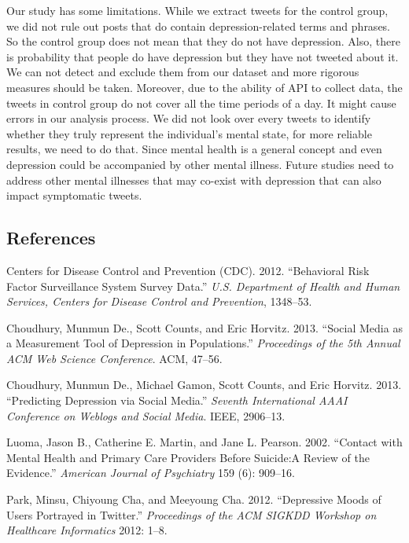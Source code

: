 \documentclass[]{article}
\begin{document}
Our study has some limitations. While we extract tweets for the control
group, we did not rule out posts that do contain depression-related
terms and phrases. So the control group does not mean that they do not
have depression. Also, there is probability that people do have
depression but they have not tweeted about it. We can not detect and
exclude them from our dataset and more rigorous measures should be
taken. Moreover, due to the ability of API to collect data, the tweets
in control group do not cover all the time periods of a day. It might
cause errors in our analysis process. We did not look over every tweets
to identify whether they truly represent the individual's mental state,
for more reliable results, we need to do that. Since mental health is a
general concept and even depression could be accompanied by other mental
illness. Future studies need to address other mental illnesses that may
co-exist with depression that can also impact symptomatic tweets.

\hypertarget{references}{%
\subsection*{References}\label{references}}

\hypertarget{refs}{}
\leavevmode\hypertarget{ref-CDC2008}{}%
Centers for Disease Control and Prevention (CDC). 2012. ``Behavioral
Risk Factor Surveillance System Survey Data.'' \emph{U.S. Department of
Health and Human Services, Centers for Disease Control and Prevention},
1348--53.

\leavevmode\hypertarget{ref-MChoudhury2013}{}%
Choudhury, Munmun De., Scott Counts, and Eric Horvitz. 2013. ``Social
Media as a Measurement Tool of Depression in Populations.''
\emph{Proceedings of the 5th Annual ACM Web Science Conference}. ACM,
47--56.

\leavevmode\hypertarget{ref-Choudhury2013}{}%
Choudhury, Munmun De., Michael Gamon, Scott Counts, and Eric Horvitz.
2013. ``Predicting Depression via Social Media.'' \emph{Seventh
International AAAI Conference on Weblogs and Social Media}. IEEE,
2906--13.

\leavevmode\hypertarget{ref-Luoma2002}{}%
Luoma, Jason B., Catherine E. Martin, and Jane L. Pearson. 2002.
``Contact with Mental Health and Primary Care Providers Before Suicide:A
Review of the Evidence.'' \emph{American Journal of Psychiatry} 159 (6):
909--16.

\leavevmode\hypertarget{ref-Park2012}{}%
Park, Minsu, Chiyoung Cha, and Meeyoung Cha. 2012. ``Depressive Moods of
Users Portrayed in Twitter.'' \emph{Proceedings of the ACM SIGKDD
Workshop on Healthcare Informatics} 2012: 1--8.
\end{document}
